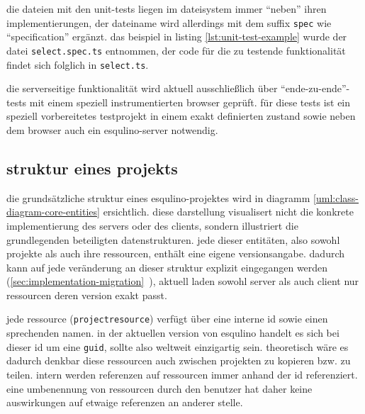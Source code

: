 die dateien mit den unit-tests liegen im dateisystem immer "`neben"' ihren implementierungen, der dateiname wird allerdings mit dem suffix \lstinline{spec} wie "`specification"' ergänzt. das beispiel in listing  \ref{lst:unit-test-example} wurde der datei \lstinline{select.spec.ts} entnommen, der code für die zu testende funktionalität findet sich folglich in \lstinline{select.ts}.



die serverseitige funktionalität wird aktuell ausschließlich über "`ende-zu-ende"'-tests mit einem speziell instrumentierten browser geprüft. für diese tests ist ein speziell vorbereitetes testprojekt in einem exakt definierten zustand sowie neben dem browser auch ein esqulino-server notwendig.

\subsection{struktur eines projekts}

die grundsätzliche struktur eines esqulino-projektes wird in diagramm \ref{uml:class-diagram-core-entities} ersichtlich. diese darstellung visualisert nicht die konkrete implementierung des servers oder des clients, sondern illustriert die grundlegenden beteiligten datenstrukturen. jede dieser entitäten, also sowohl projekte als auch ihre ressourcen, enthält eine eigene versionsangabe. dadurch kann auf jede veränderung an dieser struktur explizit eingegangen werden (\ref{sec:implementation-migration}~), aktuell laden sowohl server als auch client nur ressourcen deren version exakt passt.

jede ressource (\lstinline{projectresource}) verfügt über eine interne id sowie einen sprechenden namen. in der aktuellen version von esqulino handelt es sich bei dieser id um eine \lstinline{guid}, sollte also weltweit einzigartig sein. theoretisch wäre es dadurch denkbar diese ressourcen auch zwischen projekten zu kopieren bzw. zu teilen. intern werden referenzen auf ressourcen immer anhand der id referenziert. eine umbenennung von ressourcen durch den benutzer hat daher keine auswirkungen auf etwaige referenzen an anderer stelle.

